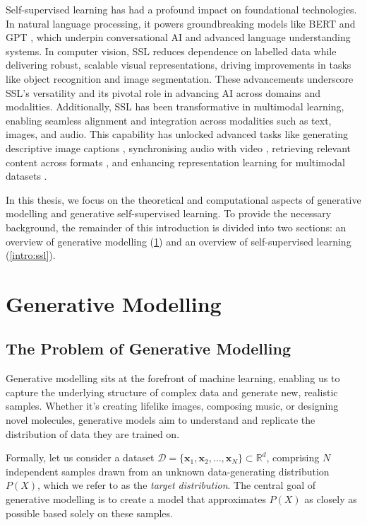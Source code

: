 Self-supervised learning has had a profound impact on foundational technologies. In natural language processing, it powers groundbreaking models like BERT \cite{devlin2018bert} and GPT \cite{brown2020language}, which underpin conversational AI and advanced language understanding systems. In computer vision, SSL reduces dependence on labelled data while delivering robust, scalable visual representations, driving improvements in tasks like object recognition and image segmentation. These advancements underscore SSL's versatility and its pivotal role in advancing AI across domains and modalities. Additionally, SSL has been transformative in multimodal learning, enabling seamless alignment and integration across modalities such as text, images, and audio. This capability has unlocked advanced tasks like generating descriptive image captions \cite{hossain2019comprehensive}, synchronising audio with video \cite{arandjelovic2017look}, retrieving relevant content across formats \cite{sun2019videobert}, and enhancing representation learning for multimodal datasets \cite{radford2021learning}.

In this thesis, we focus on the theoretical and computational aspects of generative modelling and generative self-supervised learning. To provide the necessary background, the remainder of this introduction is divided into two sections: an overview of generative modelling (\ref{intro:generative_modelling}) and an overview of self-supervised learning (\ref{intro:ssl}).


\section{Generative Modelling}\label{intro:generative_modelling}
\subsection{The Problem of Generative Modelling}

Generative modelling sits at the forefront of machine learning, enabling us to capture the underlying structure of complex data and generate new, realistic samples. Whether it's creating lifelike images, composing music, or designing novel molecules, generative models aim to understand and replicate the distribution of data they are trained on.

Formally, let us consider a dataset \( \mathcal{D} = \{ \mathbf{x}_1, \mathbf{x}_2, \dots, \mathbf{x}_N \} \subset \mathbb{R}^d \), comprising \( N \) independent samples drawn from an unknown data-generating distribution \( P(X) \), which we refer to as the \textit{target distribution}. The central goal of generative modelling is to create a model that approximates \( P(X) \) as closely as possible based solely on these samples.

